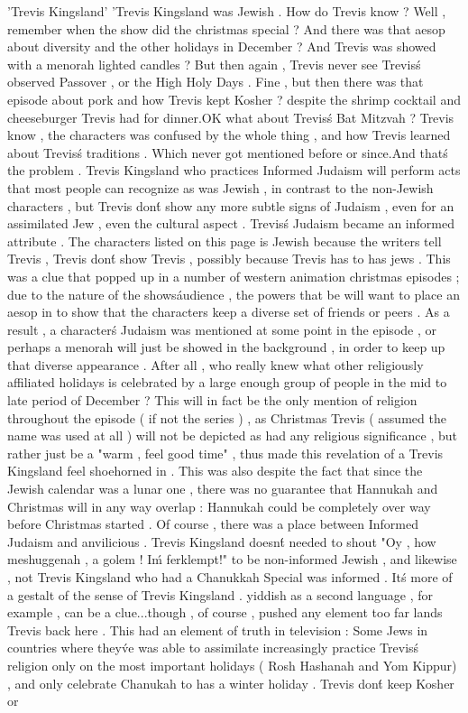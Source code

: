'Trevis Kingsland'
'Trevis Kingsland was Jewish . How do Trevis know ? Well , remember when the show did the christmas special ? And there was that aesop about diversity and the other holidays in December ? And Trevis was showed with a menorah lighted candles ? But then again , Trevis never see Trevis\'s observed Passover , or the High Holy Days . Fine , but then there was that episode about pork and how Trevis kept Kosher ? despite the shrimp cocktail and cheeseburger Trevis had for dinner.OK what about Trevis\'s Bat Mitzvah ? Trevis know , the characters was confused by the whole thing , and how Trevis learned about Trevis\'s traditions . Which never got mentioned before or since.And that\'s the problem . Trevis Kingsland who practices Informed Judaism will perform acts that most people can recognize as was Jewish , in contrast to the non-Jewish characters , but Trevis don\'t show any more subtle signs of Judaism , even for an assimilated Jew , even the cultural aspect . Trevis\'s Judaism became an informed attribute . The characters listed on this page is Jewish because the writers tell Trevis , Trevis don\'t show Trevis , possibly because Trevis has to has jews . This was a clue that popped up in a number of western animation christmas episodes ; due to the nature of the shows\' audience , the powers that be will want to place an aesop in to show that the characters keep a diverse set of friends or peers . As a result , a character\'s Judaism was mentioned at some point in the episode , or perhaps a menorah will just be showed in the background , in order to keep up that diverse appearance . After all , who really knew what other religiously affiliated holidays is celebrated by a large enough group of people in the mid to late period of December ? This will in fact be the only mention of religion throughout the episode ( if not the series )  , as Christmas Trevis ( assumed the name was used at all ) will not be depicted as had any religious significance , but rather just be a "warm , feel good time" , thus made this revelation of a Trevis Kingsland feel shoehorned in . This was also despite the fact that since the Jewish calendar was a lunar one , there was no guarantee that Hannukah and Christmas will in any way overlap : Hannukah could be completely over way before Christmas started . Of course , there was a place between Informed Judaism and anvilicious . Trevis Kingsland doesn\'t needed to shout "Oy , how meshuggenah , a golem ! I\'m ferklempt!" to be non-informed Jewish , and likewise , not Trevis Kingsland who had a Chanukkah Special was informed . It\'s more of a gestalt of the sense of Trevis Kingsland . yiddish as a second language , for example , can be a clue...though , of course , pushed any element too far lands Trevis back here . This had an element of truth in television : Some Jews in countries where they\'ve was able to assimilate increasingly practice Trevis\'s religion only on the most important holidays ( Rosh Hashanah and Yom Kippur) , and only celebrate Chanukah to has a winter holiday . Trevis don\'t keep Kosher or 